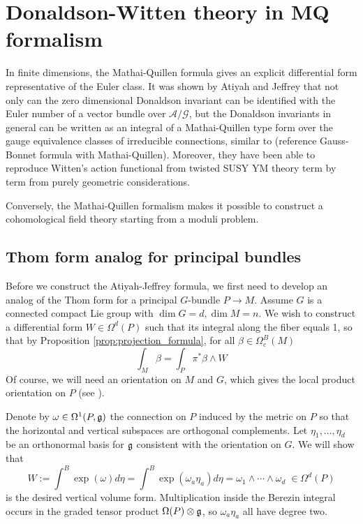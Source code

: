\chapter{Donaldson-Witten theory in MQ formalism}
\label{chapter4}
In finite dimensions, the Mathai-Quillen formula gives an explicit differential
form representative of the Euler class. 
It was shown by Atiyah and
Jeffrey \cite{atiyahlagrangians} that not only can the zero dimensional
Donaldson invariant can be identified with the Euler number of a vector bundle
over $\mathcal{A} /\mathcal{G}$, but the Donaldson invariants in general can be
written as an integral of a Mathai-Quillen type form over the gauge equivalence
classes of irreducible connections, similar to (reference Gauss-Bonnet formula
with Mathai-Quillen).
Moreover, they have been able to reproduce Witten's
action functional from twisted SUSY YM theory term by term from purely geometric
considerations.

Conversely,
the Mathai-Quillen formalism makes it possible to construct a cohomological field
theory starting from a moduli problem.

\section{Thom form analog for principal bundles}
Before we construct the Atiyah-Jeffrey formula, we first need to develop an
analog of the Thom form for a principal $G$-bundle $P\to M$. Assume $G$ is
a connected compact Lie group with $\dim G = d, \dim M = n$. 
We wish to construct a differential form  $W\in \Omega^d(P)$
such that its integral along the fiber equals 1, so that by 
Proposition \ref{prop:projection_formula}, for all $\beta\in \Omega_c^B(M)$
\begin{equation} \label{eq:principal_thom_local}
	\int_M \beta = \int_P \pi^*\beta \wedge W
\end{equation}
Of course, we will need an orientation on $M$ and $G$, which gives the local
product orientation on $P$ (see \cite[p.64]{bott_tu}).   

Denote by $\omega \in \Omega^1(P,\operatorname{\mathfrak{g}})$ the connection on
$P$ induced by the metric on $P$ so that the horizontal and
vertical subspaces are orthogonal complements. Let $\eta_1,\ldots,\eta_d$ be an 
orthonormal basis for $\operatorname{\mathfrak{g}}$ consistent with the orientation on $G$.
We will show that
\begin{equation} \label{eq:principal_thom}
W := \int^B \exp(\omega) d\eta 
= \int^B \exp(\omega_a\eta_a) d\eta = \omega_1 \wedge \cdots \wedge\omega_d
\;\in \Omega^d(P)
\end{equation}
is the desired vertical volume form. Multiplication inside the Berezin
integral occurs in the graded tensor product $\Omega(P)\otimes \operatorname{\mathfrak{g}}$, 
so $\omega_a\eta_a$ all have degree two.

